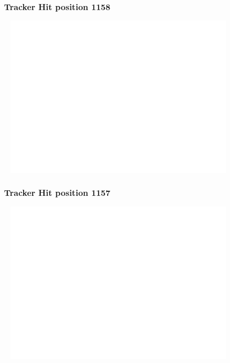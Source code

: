 \documentclass[slidestop,compress,mathserif]{beamer}
\begin{document}
\begin{frame}\frametitle{Tracker Hit position 1158}
	 \includegraphics[width=12cm,height=8cm]{Tracker_Hit_position_1158.pdf}
\end{frame}
\begin{frame}\frametitle{Tracker Hit position 1157}
	 \includegraphics[width=12cm,height=8cm]{Tracker_Hit_position_1157.pdf}
\end{frame}
\end{document}
